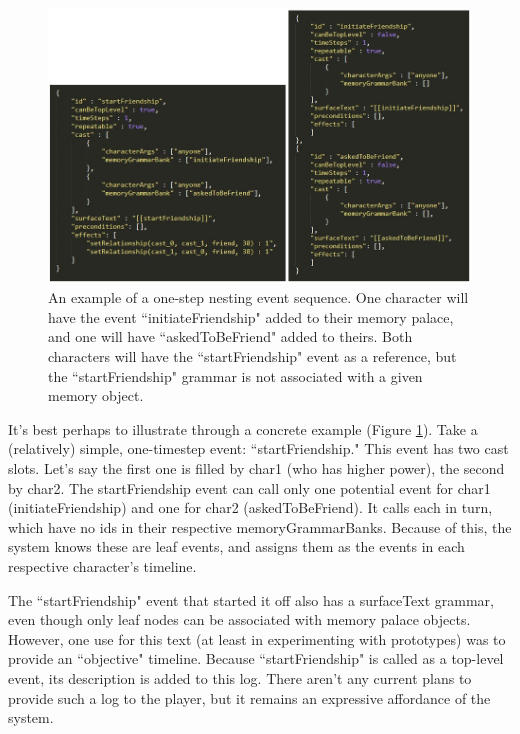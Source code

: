 
\begin{figure}
    \centering
    \includegraphics[width=\textwidth]{figures/4-Delve/delve-data-one-step-event-sequence.jpg}
    \caption{An example of a one-step nesting event sequence. One character will have the event ``initiateFriendship" added to their memory palace, and one will have ``askedToBeFriend" added to theirs. Both characters will have the ``startFriendship" event as a reference, but the ``startFriendship" grammar is not associated with a given memory object.}
    \label{fig:one-step-event-sequence}
\end{figure}


It's best perhaps to illustrate through a concrete example (Figure \ref{fig:one-step-event-sequence}). Take a (relatively) simple, one-timestep event: ``startFriendship." This event has two cast slots. Let's say the first one is filled by char1 (who has higher power), the second by char2. The startFriendship event can call only one potential event for char1 (initiateFriendship) and one for char2 (askedToBeFriend). It calls each in turn, which have no ids in their respective memoryGrammarBanks. Because of this, the system knows these are leaf events, and assigns them as the events in each respective character's timeline.

The ``startFriendship" event that started it off also has a surfaceText grammar, even though only leaf nodes can be associated with memory palace objects. However, one use for this text (at least in experimenting with prototypes) was to provide an ``objective" timeline. Because ``startFriendship" is called as a top-level event, its description is added to this log. There aren't any current plans to provide such a log to the player, but it remains an expressive affordance of the system.

